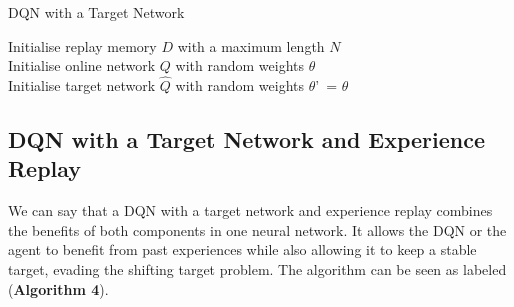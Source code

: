 \documentclass{article}
\begin{document}
\begin{algorithm}[H]
\caption{DQN with a Target Network}
\SetAlgoLined
\DontPrintSemicolon
{}
Initialise replay memory $D$ with a maximum length $N$\;\\
Initialise online network $Q$ with random weights $\theta$\; \\ 
Initialise target network $\hat{Q}$ with random weights $\theta$'\ = $\theta$\; \\ 
\end{algorithm}

\subsection{DQN with a Target Network and Experience Replay}
We can say that a DQN with a target network and experience replay combines the benefits of both components in one neural network. It allows the DQN or the agent to benefit from past experiences while also allowing it to keep a stable target, evading the shifting target problem. The algorithm can be seen as labeled (\textbf{Algorithm 4}).
\end{document}
